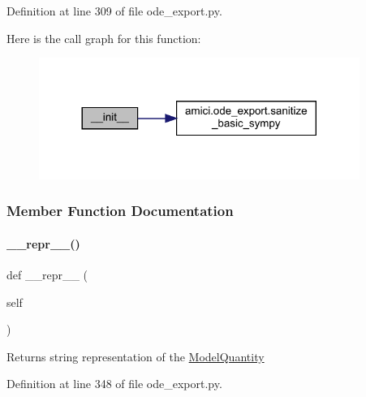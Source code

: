 Definition at line 309 of file ode\+\_\+export.\+py.

Here is the call graph for this function\+:
\nopagebreak
\begin{figure}[H]
\begin{center}
\leavevmode
\includegraphics[width=296pt]{classamici_1_1ode__export_1_1_model_quantity_a258843a3afab00b576ccf386e8673a64_cgraph}
\end{center}
\end{figure}


\subsubsection{Member Function Documentation}
\mbox{\label{classamici_1_1ode__export_1_1_model_quantity_a9a47563093dfc5ba12274b66e368920c}} 
\paragraph{\texorpdfstring{\+\_\+\+\_\+repr\+\_\+\+\_\+()}{\_\_repr\_\_()}}
{\footnotesize\ttfamily def \+\_\+\+\_\+repr\+\_\+\+\_\+ (\begin{DoxyParamCaption}\item[{}]{self }\end{DoxyParamCaption})}

\begin{DoxyReturn}{Returns}
string representation of the \mbox{\hyperlink{classamici_1_1ode__export_1_1_model_quantity}{Model\+Quantity}} 
\end{DoxyReturn}


Definition at line 348 of file ode\+\_\+export.\+py.

